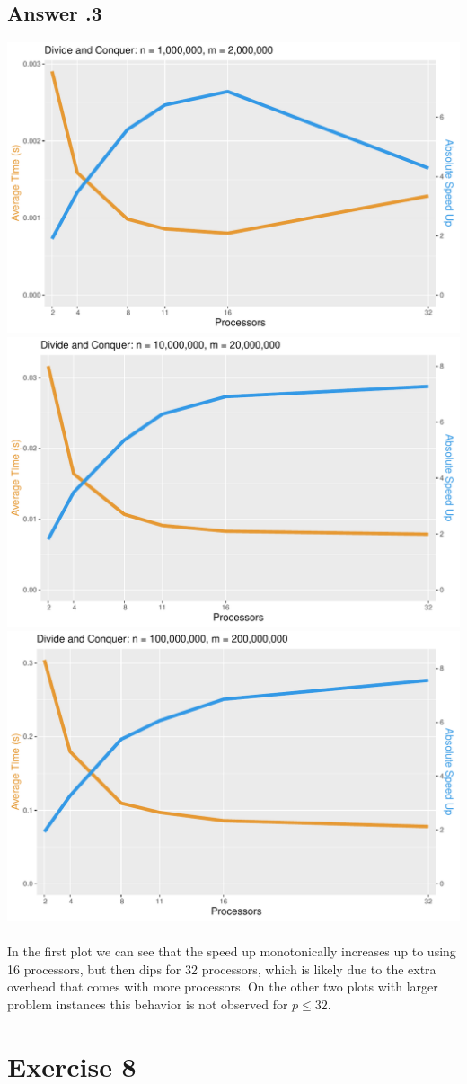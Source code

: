 \documentclass[a4paper,%
11pt,%
DIV=12,
headsepline,%
headings=normal,
]{scrartcl}
\newcounter{curex}
\newcommand{\exercise}[1]{\section*{Exercise #1}\setcounter{curex}{#1}}
\newcommand{\answer}[1]{\subsection*{Answer \arabic{curex}.#1}}
\begin{document}
\answer{3}
\includegraphics[scale=0.4,page=1]{../plots/merge_plot_Divide-and-Conquer_1000000_2000000}
\includegraphics[scale=0.4,page=1]{../plots/merge_plot_Divide-and-Conquer_10000000_20000000}
\includegraphics[scale=0.4,page=1]{../plots/merge_plot_Divide-and-Conquer_100000000_200000000}
\\
\\
In the first plot we can see that the speed up monotonically increases up to using 16 processors, but then dips for 32 processors, which is likely due to the extra overhead that comes with more processors. On the other two plots with larger problem instances this behavior is not observed for $p \leq 32$.
\exercise{8}
\end{document}
